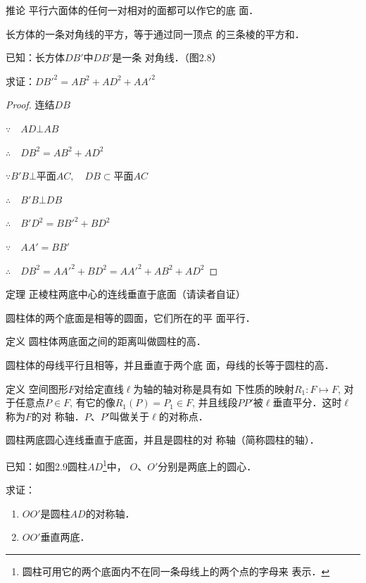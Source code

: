 \begin{blk}
    {推论} 平行六面体的任何一对相对的面都可以作它的底
面．
\end{blk}

\begin{example}
    长方体的一条对角线的平方，等于通过同一顶点
的三条棱的平方和．

已知：长方体$DB'$中$DB'$是一条
对角线．（图2.8）

求证：${DB'}^2=AB^2+AD^2+{AA'}^2$
\end{example}

\begin{proof}
    连结$DB$

$\because\quad  AD\bot AB$

$\therefore\quad DB^2=AB^2+AD^2$

$\because B'B\bot\text{平面}AC,\quad DB\subset \text{平面}AC$
    
$\therefore\quad B'B\bot DB$

$\therefore\quad B'D^2={BB'}^2+BD^2$

$\because\quad AA'=BB'$

$\therefore\quad DB^2={AA'}^2+{BD}^2={AA'}^2+AB^2+AD^2$
\end{proof}

\begin{blk}
   {定理} 正棱柱两底中心的连线垂直于底面（请读者自证）
   
   圆柱体的两个底面是相等的圆面，它们所在的平
面平行．
\end{blk}

\begin{blk}{定义} 
    圆柱体两底面之间的距离叫做圆柱的高．

    圆柱体的母线平行且相等，并且垂直于两个底
面，母线的长等于圆柱的高．
\end{blk}

\begin{blk}{定义}
空间图形$F$对给定直线$\ell$为轴的轴对称是具有如
下性质的映射$R_1:F\mapsto F$, 对于任意点$P\in F$, 有它的像$R_1(P)
=P_1\in F$, 并且线段$PP'$被$\ell$垂直平分．这时$\ell$称为$F$的对
称轴．$P$、$P'$叫做关于$\ell$的对称点．

圆柱两底圆心连线垂直于底面，并且是圆柱的对
称轴（简称圆柱的轴）．
\end{blk}

已知：如图2.9圆柱$AD$\footnote{圆柱可用它的两个底面内不在同一条母线上的两个点的字母来
表示．}中，
$O$、$O'$分别是两底上的圆心．

求证：
\begin{enumerate}
    \item $OO'$是圆柱$AD$的对称轴．
    \item $OO'$垂直两底．
\end{enumerate}

